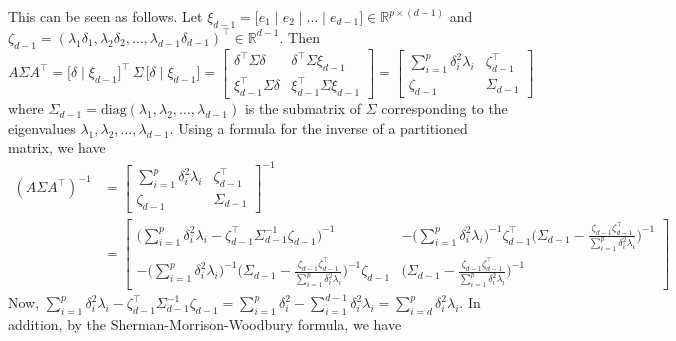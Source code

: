 \documentclass[10pt]{article}
\begin{document}
This can be seen as follows. Let $\xi_{d-1} = \bigl[e_1 \mid e_2 \mid \dots \mid e_{d-1} \bigr] \in \mathbb{R}^{p \times (d-1)}$ and $\zeta_{d-1} = (\lambda_1 \delta_1, \lambda_2 \delta_2, \dots, \lambda_{d-1} \delta_{d-1})^{\top} \in \mathbb{R}^{d-1}$. Then
\begin{equation}
A \Sigma A^{\top} = \bigl[ \delta \mid \xi_{d-1} \bigr]^{\top} \, \Sigma \, \bigl[ \delta \mid \xi_{d-1} \bigr] = \begin{bmatrix} \delta^{\top} \Sigma \delta & \delta^{\top} \Sigma \xi_{d-1} \\ \xi_{d-1}^{\top} \Sigma \delta & \xi_{d-1}^{\top} \Sigma \xi_{d-1} \end{bmatrix} = 
\begin{bmatrix} \sum_{i=1}^{p} \delta_i^{2} \lambda_i & \zeta_{d-1}^{\top} \\ \zeta_{d-1} & \Sigma_{d-1} \end{bmatrix}
\end{equation}
where $\Sigma_{d-1} = \mathrm{diag}(\lambda_1, \lambda_2, \dots, \lambda_{d-1})$ is the submatrix of $\Sigma$ corresponding to the eigenvalues $\lambda_1, \lambda_2, \dots, \lambda_{d-1}$. Using a formula for the inverse of a partitioned matrix, we have
\begin{equation}
\begin{split}
(A \Sigma A^{\top})^{-1} &= \begin{bmatrix} \sum_{i=1}^{p} \delta_i^{2} \lambda_i & \zeta_{d-1}^{\top} \\ \zeta_{d-1} & \Sigma_{d-1} \end{bmatrix}^{-1} 
\\ & = \begin{bmatrix} \bigl(\sum_{i=1}^{p} \delta_i^{2} \lambda_i - \zeta_{d-1}^{\top} \Sigma_{d-1}^{-1} \zeta_{d-1}\bigr)^{-1} & - \bigl(\sum_{i=1}^{p} \delta_i^{2} \lambda_i\bigr)^{-1} \zeta_{d-1}^{\top} \bigl(\Sigma_{d-1} - \frac{\zeta_{d-1} \zeta_{d-1}^{\top}}{\sum_{i=1}^{p} \delta_i^{2} \lambda_i}\bigr)^{-1} \\ - \bigl(\sum_{i=1}^{p} \delta_i^{2} \lambda_i\bigr)^{-1} \bigl(\Sigma_{d-1} - \frac{\zeta_{d-1} \zeta_{d-1}^{\top}}{\sum_{i=1}^{p} \delta_i^{2} \lambda_i}\bigr)^{-1} \zeta_{d-1} & \bigl(\Sigma_{d-1} - \frac{\zeta_{d-1} \zeta_{d-1}^{\top}}{\sum_{i=1}^{p} \delta_i^{2} \lambda_i}\bigr)^{-1}
\end{bmatrix}
\end{split}
\end{equation}
Now, $\sum_{i=1}^{p} \delta_i^{2} \lambda_i - \zeta_{d-1}^{\top} \Sigma_{d-1}^{-1} \zeta_{d-1} = \sum_{i=1}^{p} \delta_i^{2} - \sum_{i=1}^{d-1} \delta_i^{2} \lambda_i = \sum_{i=d}^{p} \delta_i^{2} \lambda_i$. In addition, by the Sherman-Morrison-Woodbury formula, we have
\end{document}
